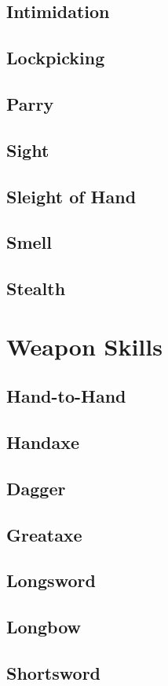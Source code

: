 \subsection{Intimidation}\label{skill:intimidation}

\subsection{Lockpicking}\label{skill:lockpicking}

\subsection{Parry}\label{skill:parry}

\subsection{Sight}\label{skill:sight}

\subsection{Sleight of Hand}\label{skill:sleight-of-hand}

\subsection{Smell}\label{skill:smell}

\subsection{Stealth}\label{skill:stealth}

\section{Weapon Skills}

\subsection{Hand-to-Hand}\label{skill:hand-to-hand}

\subsection{Handaxe}\label{skill:handaxe}

\subsection{Dagger}\label{skill:dagger}

\subsection{Greataxe}\label{skill:greataxe}

\subsection{Longsword}\label{skill:longsword}

\subsection{Longbow}\label{skill:longbow}

\subsection{Shortsword}\label{skill:shortsword}

